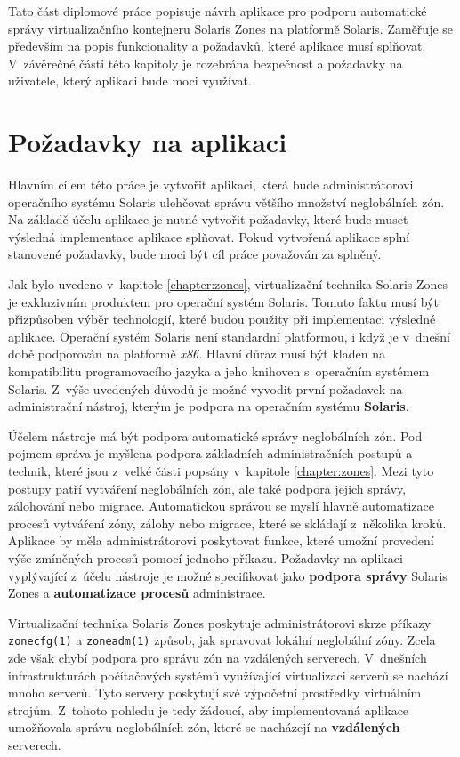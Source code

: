 \label{chapter:design}
Tato část diplomové práce popisuje návrh aplikace pro podporu automatické správy virtualizačního kontejneru Solaris Zones na
platformě Solaris. Zaměřuje se především na popis funkcionality a požadavků, které aplikace musí splňovat. V~závěrečné části
této kapitoly je rozebrána bezpečnost a požadavky na uživatele, který aplikaci bude moci využívat.
\section{Požadavky na aplikaci}
\label{chapter:design:demands}
Hlavním cílem této práce je vytvořit aplikaci, která bude administrátorovi operačního systému Solaris ulehčovat správu
většího množství neglobálních zón. Na základě účelu aplikace je nutné vytvořit požadavky, které bude muset výsledná implementace
aplikace splňovat. Pokud vytvořená aplikace splní stanovené požadavky, bude moci být cíl práce považován za splněný.

Jak bylo uvedeno v~kapitole \ref{chapter:zones}, virtualizační technika Solaris Zones je exkluzivním produktem pro operační
systém Solaris. Tomuto faktu musí být přizpůsoben výběr technologií, které budou použity při implementaci výsledné aplikace.
Operační systém Solaris není standardní platformou, i když je v~dnešní době podporován na platformě \textit{x86}. Hlavní důraz
musí být kladen na kompatibilitu programovacího jazyka a jeho knihoven s~operačním systémem Solaris. Z~výše uvedených důvodů
je možné vyvodit první požadavek na administrační nástroj, kterým je podpora na operačním systému \textbf{Solaris}.

Účelem nástroje má být podpora automatické správy neglobálních zón. Pod pojmem správa je myšlena podpora základních administračních
postupů a technik, které jsou z~velké části popsány v~kapitole \ref{chapter:zones}. Mezi tyto postupy patří 
vytváření neglobálních zón, ale také podpora jejich správy, zálohování nebo migrace. Automatickou správou se myslí hlavně
automatizace procesů vytváření zóny, zálohy nebo migrace, které se skládají z~několika kroků. Aplikace by měla administrátorovi
poskytovat funkce, které umožní provedení výše zmíněných procesů pomocí jednoho příkazu. Požadavky na aplikaci vyplývající
z~účelu nástroje je možné specifikovat jako \textbf{podpora správy} Solaris Zones a \textbf{automatizace procesů} administrace.

Virtualizační technika Solaris Zones poskytuje administrátorovi skrze příkazy \verb|zonecfg(1)| a \verb|zoneadm(1)| způsob,
jak spravovat lokální neglobální zóny. Zcela zde však chybí podpora pro správu zón na vzdálených serverech. V~dnešních infrastrukturách
počítačových systémů využívající virtualizaci serverů se nachází mnoho serverů. Tyto servery poskytují své výpočetní prostředky
virtuálním strojům. Z~tohoto pohledu je tedy žádoucí, aby implementovaná aplikace umožňovala správu neglobálních zón, které
se nacházejí na \textbf{vzdálených} serverech.

